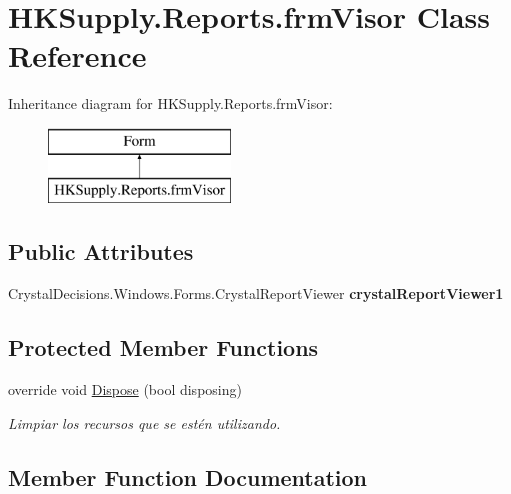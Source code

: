 \hypertarget{class_h_k_supply_1_1_reports_1_1frm_visor}{}\section{H\+K\+Supply.\+Reports.\+frm\+Visor Class Reference}
\label{class_h_k_supply_1_1_reports_1_1frm_visor}
Inheritance diagram for H\+K\+Supply.\+Reports.\+frm\+Visor\+:\begin{figure}[H]
\begin{center}
\leavevmode
\includegraphics[height=2.000000cm]{class_h_k_supply_1_1_reports_1_1frm_visor}
\end{center}
\end{figure}
\subsection*{Public Attributes}
\begin{DoxyCompactItemize}
\item 
\mbox{\label{class_h_k_supply_1_1_reports_1_1frm_visor_ad10c195b523d201f4c39e9365a8c8304}} 
Crystal\+Decisions.\+Windows.\+Forms.\+Crystal\+Report\+Viewer {\bfseries crystal\+Report\+Viewer1}
\end{DoxyCompactItemize}
\subsection*{Protected Member Functions}
\begin{DoxyCompactItemize}
\item 
override void \mbox{\hyperlink{class_h_k_supply_1_1_reports_1_1frm_visor_ac193655c1e328134a59faef0ab211ad6}{Dispose}} (bool disposing)
\begin{DoxyCompactList}\small\item\em Limpiar los recursos que se estén utilizando. \end{DoxyCompactList}\end{DoxyCompactItemize}


\subsection{Member Function Documentation}
\mbox{\label{class_h_k_supply_1_1_reports_1_1frm_visor_ac193655c1e328134a59faef0ab211ad6}} 

